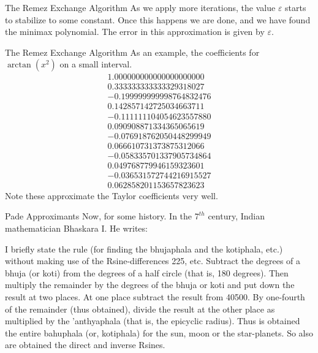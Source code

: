 \documentclass{beamer}
\begin{document}
    \begin{frame}{The Remez Exchange Algorithm}
        As we apply more iterations, the value $\varepsilon$ starts to stabilize
        to some constant. Once this happens we are done, and we have found the
        minimax polynomial. The error in this approximation is given by
        $\varepsilon$.
    \end{frame}
    \begin{frame}{The Remez Exchange Algorithm}
        As an example, the coefficients for $\arctan(x^2)$ on a small interval.
        \begin{align}
            1.000000000000000000000\\
            0.333333333333329318027\\
            -0.199999999998764832476\\
            0.142857142725034663711\\
            -0.111111104054623557880\\
            0.090908871334365065619\\
            -0.076918762050448299949\\
            0.066610731373875312066\\
            -0.058335701337905734864\\
            0.049768779946159323601\\
            -0.036531572744216915527\\
            0.062858201153657823623
        \end{align}
        Note these approximate the Taylor coefficients very well.
    \end{frame}
    \begin{frame}{Pade Approximants}
        Now, for some history. In the $7^{th}$ century, Indian mathematician
        Bhaskara I. He writes:
        \begin{center}
            I briefly state the rule (for finding the bhujaphala
            and the kotiphala, etc.) without making use of the
            Rsine-differences 225, etc. Subtract the degrees of a bhuja
            (or koti) from the degrees of a half circle (that is, 180 degrees).
            Then multiply the remainder by the degrees of the bhuja or koti
            and put down the result at two places. At one place subtract the
            result from 40500. By one-fourth of the remainder (thus obtained),
            divide the result at the other place as multiplied by the
            'anthyaphala (that is, the epicyclic radius). Thus is obtained
            the entire bahuphala (or, kotiphala) for the sun, moon or the
            star-planets. So also are obtained the direct and inverse Rsines.
        \end{center}
    \end{frame}
\end{document}
